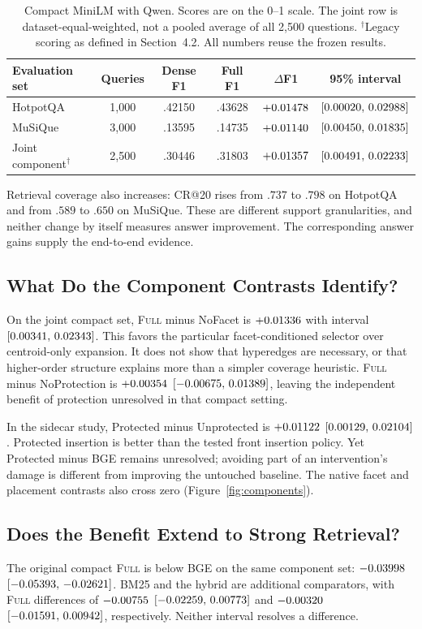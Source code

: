 \documentclass[11pt]{article}
\newcommand{\full}{\textsc{Full}\xspace}
\begin{document}
\begin{table}[t]
\centering\small
\begin{tabular}{@{}lccccc@{}}
\toprule
Evaluation set & Queries & Dense F1 & Full F1 & $\Delta$F1 & 95\% interval\\
\midrule
HotpotQA & 1,000 & .42150 & .43628 & $+0.01478$ & $[0.00020,\,0.02988]$\\
MuSiQue & 3,000 & .13595 & .14735 & $+0.01140$ & $[0.00450,\,0.01835]$\\
Joint component$^\dagger$ & 2,500 & .30446 & .31803 & $+0.01357$ & $[0.00491,\,0.02233]$\\
\bottomrule
\end{tabular}
\caption{Compact MiniLM with Qwen. Scores are on the 0--1 scale. The joint row
is dataset-equal-weighted, not a pooled average of all 2,500 questions.
$^\dagger$Legacy scoring as defined in Section~4.2. All numbers reuse
the frozen results.}
\label{tab:compact}
\end{table}

Retrieval coverage also increases: CR@20 rises from $.737$ to $.798$ on
HotpotQA and from $.589$ to $.650$ on MuSiQue. These are different support
granularities, and neither change by itself measures answer improvement.
The corresponding answer gains supply the end-to-end evidence.

\subsection{What Do the Component Contrasts Identify?}
On the joint compact set, \full minus NoFacet is $+0.01336$
with interval $[0.00341,\,0.02343]$. This favors the particular facet-conditioned
selector over centroid-only expansion. It does not show that hyperedges are
necessary, or that higher-order structure explains more than a simpler
coverage heuristic. \full minus NoProtection is $+0.00354$
$[-0.00675,\,0.01389]$, leaving the independent benefit of protection unresolved
in that compact setting.

In the sidecar study, Protected minus Unprotected is $+0.01122$
$[0.00129,\,0.02104]$. Protected insertion is better than the tested front
insertion policy. Yet Protected minus BGE remains unresolved; avoiding part of
an intervention's damage is different from improving the untouched baseline.
The native facet and placement contrasts also cross zero
(Figure~\ref{fig:components}).

\subsection{Does the Benefit Extend to Strong Retrieval?}
The original compact \full is below BGE on the same component set:
$-0.03998$ $[-0.05393,\,-0.02621]$. BM25 and the hybrid are additional comparators,
with \full differences of $-0.00755$ $[-0.02259,\,0.00773]$ and
$-0.00320$ $[-0.01591,\,0.00942]$, respectively.
Neither interval resolves a difference.
\end{document}
